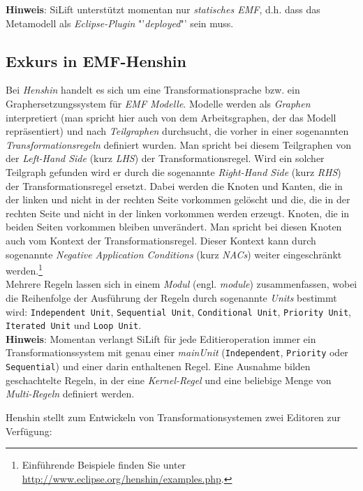 \textbf{Hinweis}: SiLift unterstützt momentan nur \textit{statisches EMF}, d.h. dass das Metamodell als \textit{Eclipse-Plugin} "'\textit{deployed}"' sein muss.

\subsection{Exkurs in EMF-Henshin}

Bei \textit{Henshin} handelt es sich um eine Transformationsprache bzw. ein Graphersetzungssystem für \textit{EMF Modelle}. 
Modelle werden als \textit{Graphen} interpretiert (man spricht hier auch von dem Arbeitsgraphen, der das Modell repräsentiert) und nach \textit{Teilgraphen} durchsucht, die vorher in einer sogenannten \textit{Transformationsregeln} definiert wurden.
Man spricht bei diesem Teilgraphen von der \textit{Left-Hand Side} (kurz \textit{LHS}) der Trans\-for\-ma\-tions\-re\-gel. 
Wird ein solcher Teilgraph gefunden wird er durch die sogenannte \textit{Right-Hand Side} (kurz \textit{RHS}) der Transformationsregel ersetzt. 
Dabei werden die Knoten und Kanten, die in der linken und nicht in der rechten Seite vorkommen gelöscht und die, die in der rechten Seite und nicht in der linken vorkommen werden erzeugt.
Knoten, die in beiden Seiten vorkommen bleiben unverändert.
Man spricht bei diesen Knoten auch vom Kontext der Transformationsregel.
Dieser Kontext kann durch sogenannte \textit{Negative Application Conditions} (kurz \textit{NACs}) weiter eingeschränkt werden.\footnote{Einführende Beispiele finden Sie unter \url{http://www.eclipse.org/henshin/examples.php}.}\\
Mehrere Regeln lassen sich in einem \textit{Modul} (engl. \textit{module}) zusammenfassen, wobei die Reihenfolge der Ausführung der Regeln durch sogenannte \textit{Units} bestimmt wird: \texttt{Independent Unit}, \texttt{Sequential Unit}, \texttt{Conditional Unit}, \texttt{Priority Unit}, \texttt{Iterated Unit} und \texttt{Loop Unit}.\\

\textbf{Hinweis}: Momentan verlangt SiLift für jede Editieroperation immer ein Transformationssystem mit genau einer \textit{mainUnit} (\texttt{Independent}, \texttt{Priority} oder \texttt{Sequential}) und einer darin enthaltenen Regel. Eine Ausnahme bilden geschachtelte Regeln, in der eine \textit{Kernel-Regel} und eine beliebige Menge von \textit{Multi-Regeln} definiert werden.


Henshin stellt zum Entwickeln von Transformationsystemen zwei Editoren zur Verfügung:

